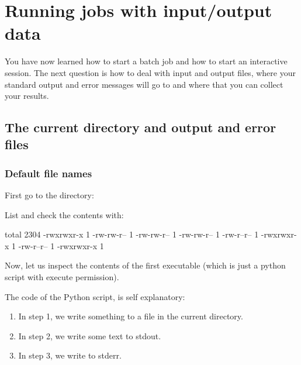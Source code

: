 \chapter{Running jobs with input/output data}

You have now learned how to start a batch job and how to start an interactive
session.  The next question is how to deal with input and output files, where
your standard output and error messages will go to and where that you can
collect your results.

\section{The current directory and output and error files}

\subsection{Default file names}

First go to the directory:

\begin{prompt}
\end{prompt}

List and check the contents with:
\begin{prompt}
total 2304
-rwxrwxr-x 1 %
-rw-rw-r-- 1 %
-rw-rw-r-- 1 %
-rw-rw-r-- 1 %
-rw-r--r-- 1 %
-rwxrwxr-x 1 %
-rw-r--r-- 1 %
-rwxrwxr-x 1 %
\end{prompt}

Now, let us inspect the contents of the first executable (which is just a
python script with execute permission).


The code of the Python script, is self explanatory:
\begin{enumerate}
\item  In step 1, we write something to a file in the current directory.
\item  In step 2, we write some text to stdout.
\item  In step 3, we write to stderr.
\end{enumerate}

